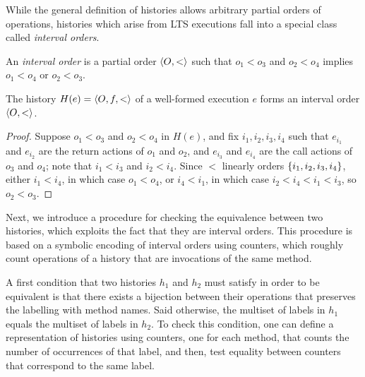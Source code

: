 While the general definition of histories allows arbitrary partial orders of
operations, histories which arise from LTS executions fall into a special class
called \emph{interval orders}.

\begin{definition}

  An \emph{interval order} is a partial order $\left\langle {O,<} \right\rangle$ such that
  $o_1 < o_3$ and $o_2 < o_4$ implies $o_1 < o_4$ or $o_2 < o_3$.

\end{definition}

\begin{lemma}
  \label{lem:intervals}

  The history $H(e) = \left\langle {O,f,<} \right\rangle$ of a well-formed execution $e$ forms an
  interval order $\left\langle {O,<} \right\rangle$.

\end{lemma}

\begin{proof}

  Suppose $o_1 < o_3$ and $o_2 < o_4$ in $H(e)$, and fix $i_1, i_2, i_3, i_4$
  such that $e_{i_1}$ and $e_{i_2}$ are the return actions of $o_1$ and $o_2$,
  and $e_{i_3}$ and $e_{i_4}$ are the call actions of $o_3$ and $o_4$; note
  that $i_1 < i_3$ and $i_2 < i_4$. Since $<$ linearly orders ${\{ i_1, i_2,
  i_3, i_4 \}}$, either $i_1 < i_4$, in which case $o_1 < o_4$, or $i_4 < i_1$, in
  which case $i_2 < i_4 < i_1 < i_3$, so $o_2 < o_3$.

\end{proof}

Next, we introduce a procedure for checking the equivalence between two
histories, which exploits the fact that they are interval orders. This
procedure is based on a symbolic encoding of interval orders using counters,
which roughly count operations of a history that are invocations of the same
method.

A first condition that two histories $h_1$ and $h_2$ must satisfy in order to
be equivalent is that there exists a bijection between their operations that
preserves the labelling with method names. Said otherwise, the multiset of
labels in $h_1$ equals the multiset of labels in $h_2$. To check this
condition, one can define a representation of histories using counters, one for
each method, that counts the number of occurrences of that label, and then,
test equality between counters that correspond to the same label.

